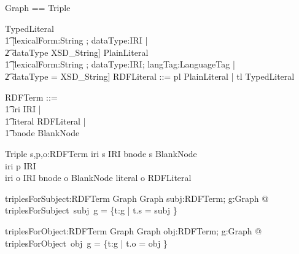 


\begin{zed}
Graph == \power Triple
\end{zed}
        

\begin{zed}
\end{zed}
        

\begin{zed}
\end{zed}
        

\begin{zed}
TypedLiteral  \\
\t1	[lexicalForm:String ; dataType:IRI | \\
\t2		dataType \neq XSD\_String]
\also
PlainLiteral  \\
\t1	[lexicalForm:String ; dataType:IRI; langTag:LanguageTag | \\
\t2		dataType = XSD\_String]
\also
RDFLiteral ::= pl \ldata PlainLiteral \rdata | tl \ldata TypedLiteral \rdata
\end{zed}
        

\begin{zed}
RDFTerm ::= \\
\t1	iri \ldata IRI \rdata | \\
\t1	literal \ldata RDFLiteral \rdata | \\
\t1	bnode \ldata BlankNode \rdata
\end{zed}
        

\begin{schema}{Triple}
   s,p,o:RDFTerm
\where
   iri \entryFor s \in IRI \lor bnode \entryFor s \in BlankNode \\
   iri \entryFor p \in IRI \\
   iri \entryFor o \in IRI \lor bnode \entryFor o \in BlankNode \lor literal \entryFor o \in RDFLiteral
\end{schema}
        

\begin{gendef}
   triplesForSubject:RDFTerm \fun Graph \fun Graph
\where
   \forall subj:RDFTerm; g:Graph @ triplesForSubject~subj~g = \{t:g | t.s = subj \}
\end{gendef}
		

\begin{gendef}
   triplesForObject:RDFTerm \fun Graph \fun Graph
\where
   \forall obj:RDFTerm; g:Graph @ triplesForObject~obj~g = \{t:g | t.o = obj \}
\end{gendef}
		

